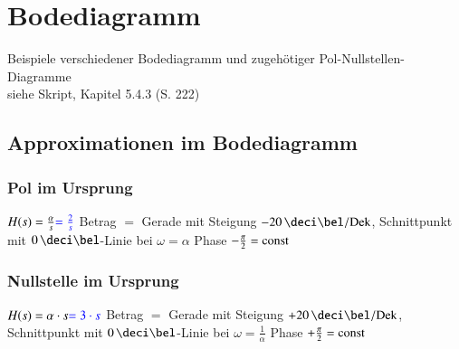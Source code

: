 \section{Bodediagramm}

Beispiele verschiedener Bodediagramm und zugehötiger Pol-Nullstellen-Diagramme \\
siehe Skript, Kapitel 5.4.3 (S. 222)


\subsection{Approximationen im Bodediagramm}

\begin{minipage}[t]{0.48\columnwidth}
    \raggedright
    \subsubsection{Pol im Ursprung}

    \begin{outline}
        \1 $H(s) = \frac{\alpha}{s} {\color{blue}= \frac{2}{s}}$
            \2 Betrag $=$ Gerade mit Steigung $- 20 \, \deci \bel / \Dek$, Schnittpunkt mit $0 \, \deci\bel$-Linie bei $\omega = \alpha$
            \2 Phase $- \frac{\pi}{2} = \mathrm{const}$
    \end{outline}

    
\end{minipage}
\hfill
\begin{minipage}[t]{0.48\columnwidth}
    \raggedright
    \subsubsection{Nullstelle im Ursprung}

    \begin{outline}
        \1 $H(s) = \alpha \cdot s {\color{blue}= 3\cdot s}$
            \2 Betrag $=$ Gerade mit Steigung $+ 20 \, \deci \bel / \Dek$, Schnittpunkt mit $0 \, \deci\bel$-Linie bei $\omega = \frac{1}{\alpha}$
            \2 Phase $+ \frac{\pi}{2} = \mathrm{const}$
    \end{outline}

    
\end{minipage}


